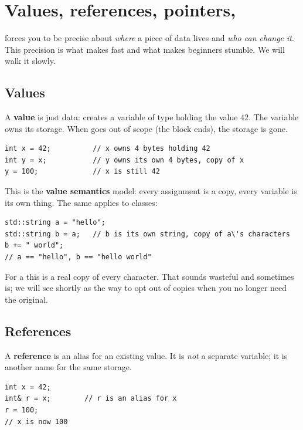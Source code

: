\section{Values, references, pointers, }
\label{sec:cpp:memory}

\cpp{} forces you to be precise about \emph{where} a piece of data
lives and \emph{who can change it}. This precision is what makes
\cpp{} fast and what makes beginners stumble. We will walk it slowly.

\subsection{Values}

A \textbf{value} is just data:  creates a variable
 of type  holding the value $42$. The variable
owns its storage. When  goes out of scope (the block ends),
the storage is gone.

\begin{lstlisting}
int x = 42;          // x owns 4 bytes holding 42
int y = x;           // y owns its own 4 bytes, copy of x
y = 100;             // x is still 42
\end{lstlisting}

This is the \textbf{value semantics} model: every assignment is a
copy, every variable is its own thing. The same applies to classes:

\begin{lstlisting}
std::string a = "hello";
std::string b = a;   // b is its own string, copy of a\'s characters
b += " world";
// a == "hello", b == "hello world"
\end{lstlisting}

For a  this is a real copy of every character.
That sounds wasteful and sometimes is; we will see 
shortly as the way to opt out of copies when you no longer need the
original.

\subsection{References}

A \textbf{reference} is an alias for an existing value. It is \emph{not}
a separate variable; it is another name for the same storage.

\begin{lstlisting}
int x = 42;
int& r = x;        // r is an alias for x
r = 100;
// x is now 100
\end{lstlisting}

